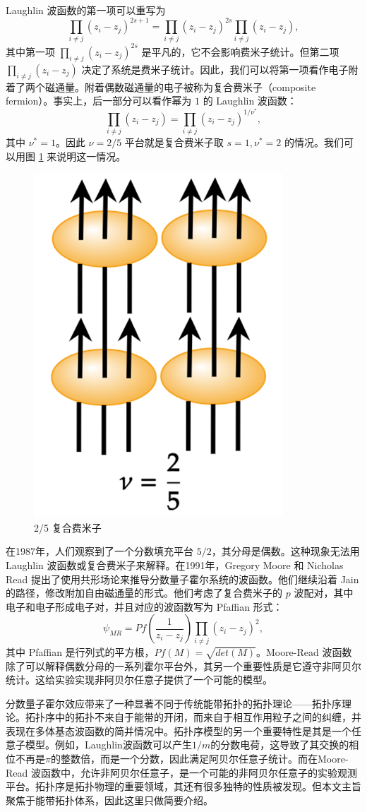 Laughlin 波函数的第一项可以重写为
\begin{equation}
    \prod_{i \neq j}\left(z_i-z_j\right)^{2s+1} = \prod_{i \neq j}\left(z_i-z_j\right)^{2s} \prod_{i \neq j}\left(z_i-z_j\right),
\end{equation}
其中第一项 $\prod_{i \neq j}\left(z_i-z_j\right)^{2s}$ 是平凡的，它不会影响费米子统计。但第二项 $\prod_{i \neq j}\left(z_i-z_j\right)$ 决定了系统是费米子统计。因此，我们可以将第一项看作电子附着了两个磁通量。附着偶数磁通量的电子被称为复合费米子（composite fermion）\cite{jain1989composite}。事实上，后一部分可以看作幂为 $1$ 的 Laughlin 波函数：
\begin{equation}
    \prod_{i \neq j}\left(z_i-z_j\right) = \prod_{i \neq j}\left(z_i-z_j\right)^{1/\nu^*},
\end{equation}
其中 $\nu^*=1$。因此 $\nu=2/5$ 平台就是复合费米子取 $s=1, \nu^*=2$ 的情况。我们可以用图 \ref{fig:CF} 来说明这一情况。
\begin{figure}[htbp]
    \centering
    \includegraphics[width=0.25\linewidth]{figure/Introduction/CompositeFermions.png}
    \caption{2/5 复合费米子}
    \label{fig:CF}
\end{figure}

在1987年，人们观察到了一个分数填充平台 $5/2$，其分母是偶数\cite{willett1987observation}。这种现象无法用 Laughlin 波函数或复合费米子来解释。在1991年，Gregory Moore 和 Nicholas Read 提出了使用共形场论来推导分数量子霍尔系统的波函数\cite{moore1991nonabelions}。他们继续沿着 Jain 的路径，修改附加自由磁通量的形式。他们考虑了复合费米子的 $p$ 波配对，其中电子和电子形成电子对，并且对应的波函数写为 Pfaffian 形式：
\begin{equation}
    \psi_{MR}=Pf\left(\frac{1}{z_i-z_j}\right)\prod_{i \neq j}\left(z_i-z_j\right)^{2},
\end{equation}
其中 Pfaffian 是行列式的平方根，$Pf(M)=\sqrt{det(M)}$。Moore-Read 波函数除了可以解释偶数分母的一系列霍尔平台外，其另一个重要性质是它遵守非阿贝尔统计。这给实验实现非阿贝尔任意子提供了一个可能的模型。

分数量子霍尔效应带来了一种显著不同于传统能带拓扑的拓扑理论——拓扑序理论。拓扑序中的拓扑不来自于能带的开闭，而来自于相互作用粒子之间的纠缠，并表现在多体基态波函数的简并情况中。拓扑序模型的另一个重要特性是其是一个任意子模型。例如，Laughlin波函数可以产生$1/m$的分数电荷，这导致了其交换的相位不再是$\pi$的整数倍，而是一个分数，因此满足阿贝尔任意子统计。而在Moore-Read 波函数中，允许非阿贝尔任意子，是一个可能的非阿贝尔任意子的实验观测平台。拓扑序是拓扑物理的重要领域，其还有很多独特的性质被发现。但本文主旨聚焦于能带拓扑体系，因此这里只做简要介绍。

